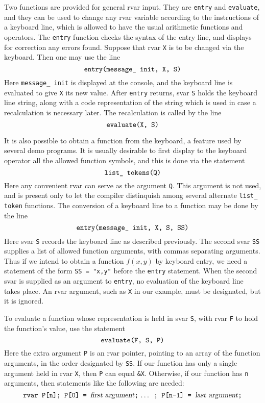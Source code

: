 Two functions are provided for general rvar input. They are {\tt entry}
and {\tt evaluate}, and they can be used to change any rvar variable
according to the instructions of a keyboard line, which is allowed
to have the usual arithmetic functions and operators.
The {\tt entry} function
checks the syntax of the entry line, and displays for correction any errors
found.
Suppose that rvar {\tt X} is to be changed via the keyboard. Then 
one may use the line
$$\hbox{\tt entry(message\_ init, X, S)}$$
Here {\tt message\_ init} is displayed at the console, and the
keyboard line is evaluated to 
give {\tt X} its new value.
After {\tt entry} returns, svar {\tt S}
holds the keyboard line string, along with a code
representation of the string which is used in case a recalculation
is necessary later. The recalculation is called by the line
$$\hbox{\tt evaluate(X, S)}$$

It is also possible to obtain a function from the keyboard, a feature used by
several demo programs. It is usually desirable to first display
to the keyboard operator all the allowed function symbols, and this
is done via the statement
$$\hbox{\tt list\_ tokens(Q)}$$
Here any convenient rvar can serve as the argument {\tt Q}. This argument is
not used, and is present only to let the compiler distinquish among
several alternate \hbox{\tt list\_ token} functions.
The conversion of a keyboard line to a function may be done by the line
$$\hbox{\tt entry(message\_ init, X, S, SS)}$$
Here svar {\tt S} records the keyboard line as described
previously. The second
svar {\tt SS} supplies a list of allowed function arguments,
with commas separating arguments. Thus if we intend to obtain a
function $f(x,y)$ by keyboard entry, we need a statement
of the form \hbox{\tt SS = "x,y"} before the {\tt entry} statement.
When the second svar is supplied as an argument to {\tt entry},
no evaluation of the keyboard line takes place. An rvar argument,
such as {\tt X} in our example, 
must be designated, but it is ignored.

To evaluate a function whose representation is held in
svar {\tt S}, with rvar {\tt F} to hold the
function's value, use the statement
$$\hbox{\tt evaluate(F, S, P)}$$
Here the extra argument {\tt P} is an rvar pointer, pointing to an array
of the function arguments, in the order designated by {\tt SS}.
If our function has only a single argument held in rvar {\tt X},
then {\tt P} can equal {\tt \&X}. Otherwise, if our function
has {\tt n} arguments, then statements like the following are needed:
$$\hbox{{\tt rvar P[n]; P[0] = {\sl first argument};}
\dots {\tt \  ;  P[n-1] = {\sl last argument};}}$$

